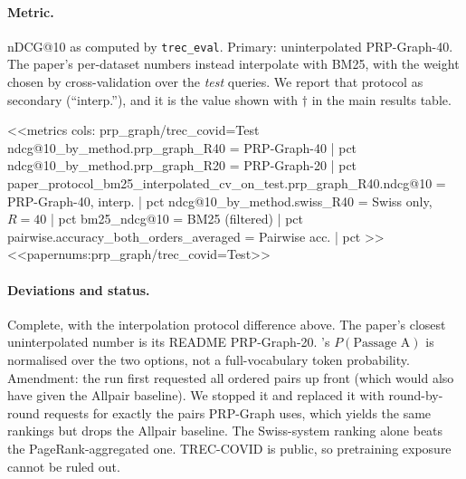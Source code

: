\paragraph{Metric.} nDCG@10 as computed by \texttt{trec\_eval}. Primary: uninterpolated PRP-Graph-40. The paper's
per-dataset numbers instead interpolate with BM25, with the weight chosen by cross-validation over the \emph{test}
queries. We report that protocol as secondary (``interp.''), and it is the value shown with $\dagger$ in the main
results table.

<<metrics
cols: prp_graph/trec_covid=Test
ndcg@10_by_method.prp_graph_R40 = PRP-Graph-40 | pct
ndcg@10_by_method.prp_graph_R20 = PRP-Graph-20 | pct
paper_protocol_bm25_interpolated_cv_on_test.prp_graph_R40.ndcg@10 = PRP-Graph-40, interp. | pct
ndcg@10_by_method.swiss_R40 = Swiss only, $R=40$ | pct
bm25_ndcg@10 = BM25 (filtered) | pct
pairwise.accuracy_both_orders_averaged = Pairwise acc. | pct
>>
<<papernums:prp_graph/trec_covid=Test>>

\paragraph{Deviations and status.} Complete, with the interpolation protocol difference above. The paper's closest
uninterpolated number is its README PRP-Graph-20. \jev{}'s $P(\text{Passage A})$ is normalised over the two options,
not a full-vocabulary token probability. Amendment: the run first requested all ordered pairs up front (which would
also have given the Allpair baseline). We stopped it and replaced it with round-by-round requests
for exactly the pairs PRP-Graph uses, which yields the same rankings but drops the Allpair baseline. The Swiss-system
ranking alone beats the PageRank-aggregated one. TREC-COVID is public, so pretraining exposure cannot be ruled out.
